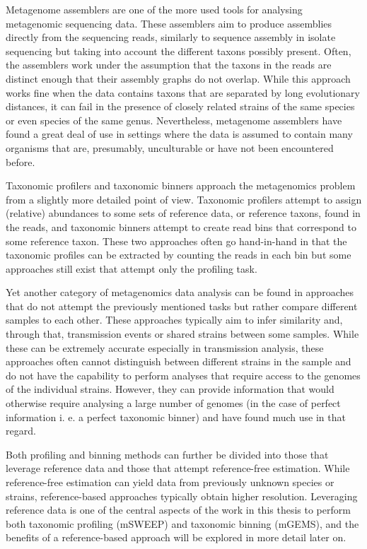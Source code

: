 \documentclass[officiallayout]{tktla}
\begin{document}
Metagenome assemblers are one of the more used tools for analysing
metagenomic sequencing data. These assemblers aim to produce
assemblies directly from the sequencing reads, similarly to sequence
assembly in isolate sequencing but taking into account the different
taxons possibly present. Often, the assemblers work under the
assumption that the taxons in the reads are distinct enough that their
assembly graphs do not overlap. While this approach works fine when
the data contains taxons that are separated by long evolutionary
distances, it can fail in the presence of closely related strains of
the same species or even species of the same genus. Nevertheless,
metagenome assemblers have found a great deal of use in settings where
the data is assumed to contain many organisms that are, presumably,
unculturable or have not been encountered before.

Taxonomic profilers and taxonomic binners approach the metagenomics
problem from a slightly more detailed point of view. Taxonomic
profilers attempt to assign (relative) abundances to some sets of
reference data, or reference taxons, found in the reads, and taxonomic
binners attempt to create read bins that correspond to some reference
taxon. These two approaches often go hand-in-hand in that the
taxonomic profiles can be extracted by counting the reads in each bin
but some approaches still exist that attempt only the profiling
task.

Yet another category of metagenomics data analysis can be found in
approaches that do not attempt the previously mentioned tasks but
rather compare different samples to each other. These approaches
typically aim to infer similarity and, through that, transmission
events or shared strains between some samples. While these can be
extremely accurate especially in transmission analysis, these
approaches often cannot distinguish between different strains in the
sample and do not have the capability to perform analyses that require
access to the genomes of the individual strains. However, they can
provide information that would otherwise require analysing a large
number of genomes (in the case of perfect information i. e. a perfect
taxonomic binner) and have found much use in that regard.

Both profiling and binning methods can further be divided into
those that leverage reference data and those that attempt
reference-free estimation. While reference-free estimation can yield
data from previously unknown species or strains, reference-based
approaches typically obtain higher resolution. Leveraging reference
data is one of the central aspects of the work in this thesis to
perform both taxonomic profiling (mSWEEP) and taxonomic binning
(mGEMS), and the benefits of a reference-based approach will be
explored in more detail later on.
\end{document}
